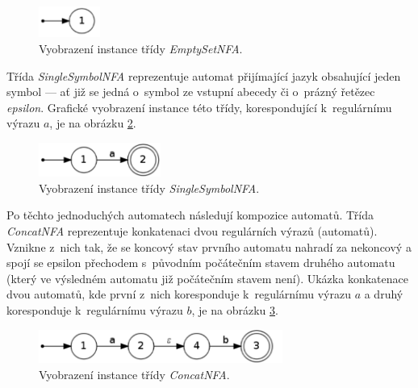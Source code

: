 \documentclass[10pt, notitlepage]{article}
\begin{document}
\begin{figure}[h]
	\begin{center}
		\includegraphics[width=2cm,keepaspectratio]{include/emptysetnfa}
	\end{center}
	\caption{Vyobrazení instance třídy \emph{EmptySetNFA}.}
	\label{fig:EmptySetNFA}
\end{figure}

Třída \emph{SingleSymbolNFA} reprezentuje automat přijímající jazyk
obsahující jeden symbol --- ať již se jedná o~symbol ze vstupní abecedy či
o~prázný řetězec \emph{epsilon}. Grafické vyobrazení instance této třídy,
korespondující k~regulárnímu výrazu $a$, je na obrázku \ref{fig:SingleSymbolNFA}.

\begin{figure}[h]
	\begin{center}
		\includegraphics[width=4cm,keepaspectratio]{include/singlesymbolnfa}
	\end{center}
	\caption{Vyobrazení instance třídy \emph{SingleSymbolNFA}.}
	\label{fig:SingleSymbolNFA}
\end{figure}

Po těchto jednoduchých automatech následují kompozice automatů. Třída
\emph{ConcatNFA} reprezentuje konkatenaci dvou regulárních výrazů (automatů).
Vznikne z~nich tak, že se koncový stav prvního automatu nahradí za nekoncový
a spojí se epsilon přechodem s~původním počátečním stavem druhého automatu
(který ve výsledném automatu již počátečním stavem není). Ukázka konkatenace
dvou automatů, kde první z~nich koresponduje k~regulárnímu výrazu $a$ a druhý
koresponduje k~regulárnímu výrazu $b$, je na obrázku \ref{fig:ConcatNFA}.

\begin{figure}[h]
	\begin{center}
		\includegraphics[width=8cm,keepaspectratio]{include/concatnfa}
	\end{center}
	\caption{Vyobrazení instance třídy \emph{ConcatNFA}.}
	\label{fig:ConcatNFA}
\end{figure}
\end{document}
